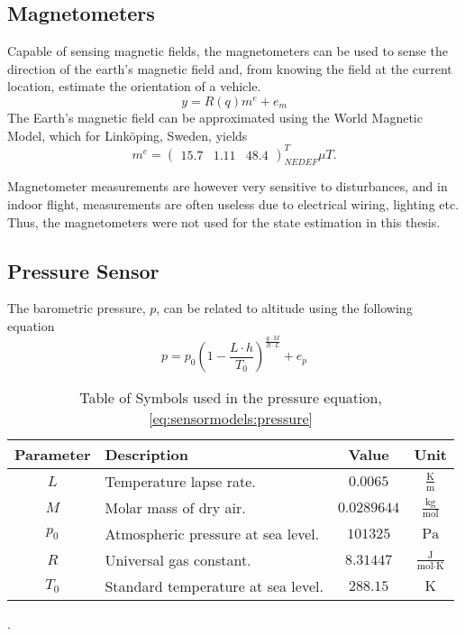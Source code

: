     \subsection{Magnetometers}
        Capable of sensing magnetic fields, the magnetometers can be used to
        sense the direction of the earth's magnetic field and, from knowing
        the field at the current location, estimate the orientation of a vehicle.
        \begin{equation}
            y = R(q) m^{e} + e_{m}
        \end{equation}
        The Earth's magnetic field can be approximated using the World Magnetic Model\cite{wmm2010},
        which for Linköping, Sweden, yields
        \begin{equation}
            m^{e} = \left(\begin{array}{ccc}
                15.7 & 1.11 & 48.4
            \end{array}\right)_{NEDEF}^{T} \mu T.
        \end{equation}

        Magnetometer measurements are however very sensitive to disturbances, and in indoor
        flight, measurements are often useless due to electrical wiring, lighting etc.
        Thus, the magnetometers were not used for the state estimation in this thesis.

    \subsection{Pressure Sensor}
        The barometric pressure, $p$, can be related to altitude using the following equation\cite{physicshandbook}
        \begin{equation}
            \label{eq:sensormodels:pressure}
            p = p_{0} \left( 1 - \frac{L \cdot h}{T_{0}} \right)^{\frac{g \cdot M}{R\cdot L}} + e_{p}
        \end{equation}
        \begin{table}
            \begin{tabularx}{\tablewidth}{|c|X|c|c|}\hline
                \textbf{Parameter} & \textbf{Description} & \textbf{Value} & \textbf{Unit} \\\hline
                $L$       & Temperature lapse rate.            & $0.0065$ & $\frac{\text{K}}{\text{m}}$ \\\hline
                $M$       & Molar mass of dry air.             & $0.0289644$ & $\frac{\text{kg}}{\text{mol}}$ \\\hline
                $p_{0}$   & Atmospheric pressure at sea level. & $101325$ & $\text{Pa}$ \\\hline
                $R$       & Universal gas constant.            & $8.31447$ & $\frac{\text{J}}{\text{mol} \cdot \text{K}}$ \\\hline
                $T_{0}$   & Standard temperature at sea level. & $288.15$ & $\text{K}$ \\\hline
            \end{tabularx}
            \label{tos:pressuresensor}
            \caption{Table of Symbols used in the pressure equation, \eqref{eq:sensormodels:pressure}}.
        \end{table}

    
